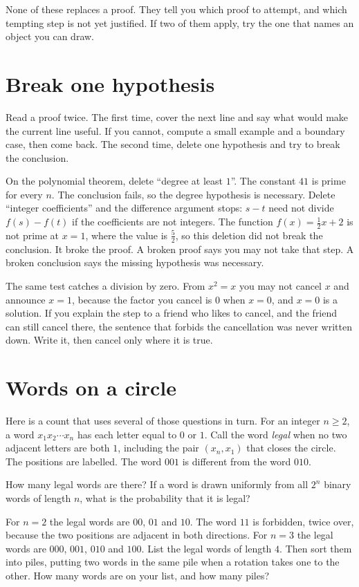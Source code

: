 None of these replaces a proof. They tell you which proof to attempt, and which tempting step is not yet justified. If two of them apply, try the one that names an object you can draw.

\section*{Break one hypothesis}
Read a proof twice. The first time, cover the next line and say what would make the current line useful. If you cannot, compute a small example and a boundary case, then come back. The second time, delete one hypothesis and try to break the conclusion.

On the polynomial theorem, delete ``degree at least $1$''. The constant $41$ is prime for every $n$. The conclusion fails, so the degree hypothesis is necessary. Delete ``integer coefficients'' and the difference argument stops: $s-t$ need not divide $f(s)-f(t)$ if the coefficients are not integers. The function $f(x)=\frac12 x+2$ is not prime at $x=1$, where the value is $\frac52$, so this deletion did not break the conclusion. It broke the proof. A broken proof says you may not take that step. A broken conclusion says the missing hypothesis was necessary.

The same test catches a division by zero. From $x^2=x$ you may not cancel $x$ and announce $x=1$, because the factor you cancel is $0$ when $x=0$, and $x=0$ is a solution. If you explain the step to a friend who likes to cancel, and the friend can still cancel there, the sentence that forbids the cancellation was never written down. Write it, then cancel only where it is true.

\section*{Words on a circle}
Here is a count that uses several of those questions in turn. For an integer $n\ge2$, a word $x_1x_2\cdots x_n$ has each letter equal to $0$ or $1$. Call the word \emph{legal} when no two adjacent letters are both $1$, including the pair $(x_n,x_1)$ that closes the circle. The positions are labelled. The word $001$ is different from the word $010$.

How many legal words are there? If a word is drawn uniformly from all $2^n$ binary words of length $n$, what is the probability that it is legal?

\begin{think}
For $n=2$ the legal words are $00$, $01$ and $10$. The word $11$ is forbidden, twice over, because the two positions are adjacent in both directions. For $n=3$ the legal words are $000$, $001$, $010$ and $100$. List the legal words of length $4$. Then sort them into piles, putting two words in the same pile when a rotation takes one to the other. How many words are on your list, and how many piles?
\end{think}

